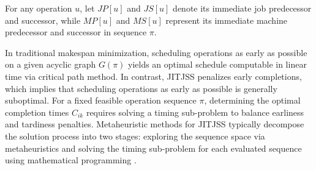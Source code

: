 For any operation $u$, let $JP[u]$ and $JS[u]$ denote its immediate job predecessor and successor, while $MP[u]$ and $MS[u]$ represent its immediate machine predecessor and successor in sequence $\pi$.

In traditional makespan minimization, scheduling operations as early as possible on a given acyclic graph $G(\pi)$ yields an optimal schedule computable in linear time via critical path method.
In contrast, JITJSS penalizes early completions, which implies that scheduling operations as early as possible is generally suboptimal.
For a fixed feasible operation sequence $\pi$, determining the optimal completion times $C_{ik}$ requires solving a timing sub-problem to balance earliness and tardiness penalties.
Metaheuristic methods for JITJSS typically decompose the solution process into two stages: exploring the sequence space via metaheuristics and solving the timing sub-problem for each evaluated sequence using mathematical programming \citep{dos2010combination, wang2014variable, ahmadian2021meta}.
